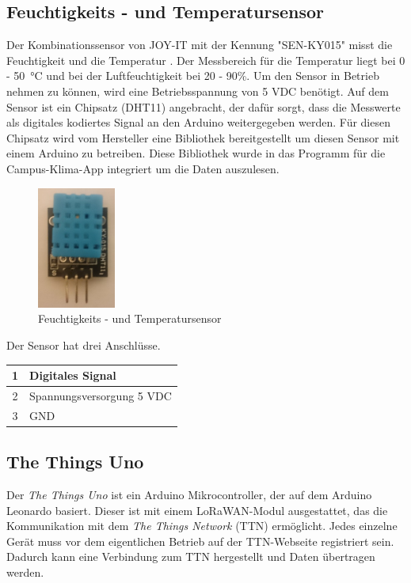 \documentclass{article}
\begin{document}
\subsection{Feuchtigkeits - und Temperatursensor}
Der Kombinationssensor von JOY-IT mit der Kennung "SEN-KY015" misst die Feuchtigkeit und die Temperatur \cite{joy-it-sensor}.
Der Messbereich für die Temperatur liegt bei 0 - \SI{50}{\degreeCelsius} und bei der Luftfeuchtigkeit bei 20 - 90\%.
Um den Sensor in Betrieb nehmen zu können, wird eine Betriebsspannung von 5 VDC benötigt.
Auf dem Sensor ist ein Chipsatz (DHT11) angebracht, der dafür sorgt, dass die Messwerte als digitales kodiertes Signal an den Arduino weitergegeben werden.
Für diesen Chipsatz wird vom Hersteller eine Bibliothek bereitgestellt um diesen Sensor mit einem Arduino zu betreiben.
Diese Bibliothek wurde in das Programm für die Campus-Klima-App integriert um die Daten auszulesen.\\

\begin{figure}[h]
 \centering
 \includegraphics[height=4cm]{images/Temp_Sensor.JPG}
 \caption{Feuchtigkeits - und Temperatursensor}
 \label{fig:temp_sensor}
\end{figure}

Der Sensor hat drei Anschlüsse. 
\begin{center}
\begin{tabular}{|c|p{}|}
    \hline
    1 & Digitales Signal \\ \hline
    2 & Spannungsversorgung 5 VDC \\ \hline
    3 & GND \\ \hline
\end{tabular}
\end{center}
\newpage
\subsection{The Things Uno}
Der \textit{The Things Uno} ist ein Arduino Mikrocontroller, der auf dem Arduino Leonardo basiert.
Dieser ist mit einem LoRaWAN-Modul ausgestattet, das die Kommunikation mit dem \textit{The Things Network} (TTN) ermöglicht. 
Jedes einzelne Gerät muss vor dem eigentlichen Betrieb auf der TTN-Webseite registriert sein.
Dadurch kann eine Verbindung zum TTN hergestellt und Daten übertragen werden\cite{TheThingsNetwork-Uno.2020}.\\
\end{document}
